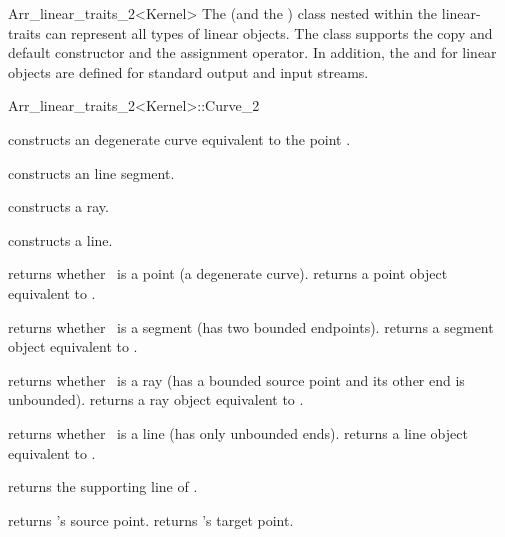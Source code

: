 \begin{ccRefClass}{Arr_linear_traits_2<Kernel>}
The  (and the ) class nested within
the linear-traits can represent all types of linear objects. The class
supports the copy and default constructor and the assignment operator.
In addition, the  and  for linear objects
are defined for standard output and input streams.

\begin{ccClass}{Arr_linear_traits_2<Kernel>::Curve_2}

\ccTypes

\ccGlue
{}
\ccGlue
{}
\ccGlue
{}

\ccCreation
{}

    {constructs an degenerate curve equivalent to the point .}

    {constructs an line segment.}

    {constructs a ray.}

    {constructs a line.}

\ccAccessFunctions

  {returns whether \ccVar\ is a point (a degenerate curve).}
\ccGlue
{}
  {returns a point object equivalent to \ccVar.
   }

  {returns whether \ccVar\ is a segment (has two bounded endpoints).}
\ccGlue
{}
  {returns a segment object equivalent to \ccVar.
   }

  {returns whether \ccVar\ is a ray (has a bounded source point and its
   other end is unbounded).}
\ccGlue
{}
  {returns a ray object equivalent to \ccVar.
   }

  {returns whether \ccVar\ is a line (has only unbounded ends).}
\ccGlue
{}
  {returns a line object equivalent to \ccVar.
   }

  {returns the supporting line of \ccVar.
   }

  {returns \ccVar's source point.
   }
\ccGlue
{}
  {returns \ccVar's target point.
   }

\end{ccClass}

\end{ccRefClass}

\ccRefPageEnd
